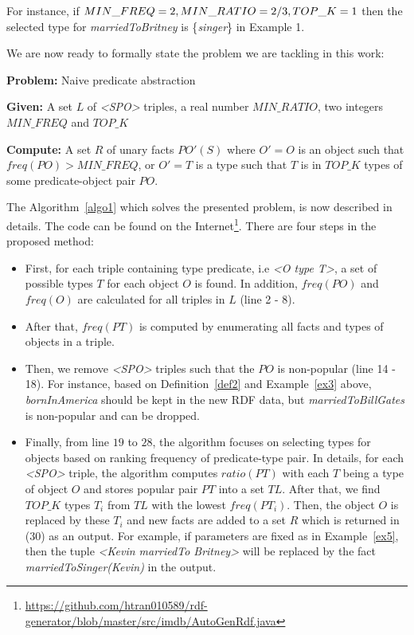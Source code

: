 \begin{example}
\label{ex5}
For instance, if $MIN\_FREQ = 2, MIN\_\\RATIO = 2 / 3, TOP\_K = 1$ then the selected type for \textit{marriedToBritney} is \{\textit{singer}\} in Example 1.
\end{example}

We are now ready to formally state the problem we are tackling in this work:

\textbf{Problem:} Naive predicate abstraction

\textbf{Given:} A set $L$ of \textit{<SPO>} triples, a real number $MIN\_RATIO$, two integers $MIN\_FREQ$ and $TOP\_K$

\textbf{Compute:} A set $R$ of unary facts $PO'(S)$ where $O' = O$ is an object such that $freq(PO) > MIN\_FREQ$, or $O' = T$ is a type such that $T$ is in $TOP\_K$ types of some predicate-object pair $PO$.

The Algorithm~\ref{algo1} which solves the presented problem, is now described in details. The code can be found on the Internet\footnote{\url{https://github.com/htran010589/rdf-generator/blob/master/src/imdb/AutoGenRdf.java}}. There are four steps in the proposed method:
\begin{itemize}
\item First, for each triple containing type predicate, i.e \textit{<O type T>}, a set of possible types $T$ for each object $O$ is found. In addition, $freq(PO)$ and $freq(O)$ are calculated for all triples in $L$ (line 2 - 8).
\item After that, $freq(PT)$ is computed by enumerating all facts and types of objects in a triple.
\item Then, we remove \textit{<SPO>} triples such that the $PO$ is non-popular (line 14 - 18). For instance, based on Definition~\ref{def2} and Example~\ref{ex3} above, \textit{bornInAmerica} should be kept in the new RDF data, but \textit{marriedToBillGates} is non-popular and can be dropped.
\item Finally, from line $19$ to $28$, the algorithm focuses on selecting types for objects based on ranking frequency of predicate-type pair. In details, for each \textit{<SPO>} triple, the algorithm computes $ratio(PT)$ with each $T$ being a type of object $O$ and stores popular pair $PT$ into a set $TL$. After that, we find $TOP\_K$ types $T_{i}$ from $TL$ with the lowest $freq(PT_{i})$. Then, the object $O$ is replaced by these $T_{i}$ and new facts are added to a set $R$ which is returned in (30) as an output. For example, if parameters are fixed as in Example~\ref{ex5}, then the tuple \textit{<Kevin marriedTo Britney>} will be replaced by the fact \textit{marriedToSinger(Kevin)} in the output.
\end{itemize}

